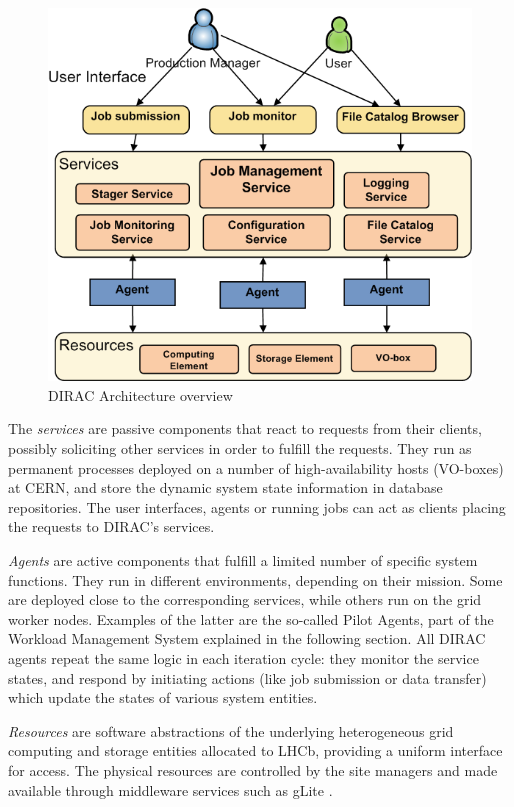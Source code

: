 \documentclass[10pt,conference]{IEEEtran}
\begin{document}
\begin{figure}[t]
\includegraphics[width=0.85\linewidth,keepaspectratio=true]{./DIRAC_Architecture.png}
\centering
\caption{DIRAC Architecture overview}
\vspace{-10 pt}
\label{fig:DIRAC-Arch}
\end{figure}
The \textit{services} are passive components that react to requests from their clients,
possibly soliciting other services in order to fulfill the requests. They run as
permanent processes deployed on a number of high-availability hosts (VO-boxes)
at CERN, and store the dynamic system state information in database
repositories. The user interfaces, agents or running jobs can act as clients
placing the requests to DIRAC's services.

\textit{Agents} are active components that fulfill a limited number of specific system
functions. They run in different environments, depending on their mission.
Some are deployed close to the corresponding services, while others run on the
grid worker nodes. Examples of the latter are the so-called Pilot Agents, part
of the Workload Management System explained in the following section. All DIRAC
agents repeat the same logic in each iteration cycle: they monitor the service states,
 and respond by initiating actions (like job
submission or data transfer) which update the states of various system
entities.

\textit{Resources} are software abstractions of the underlying heterogeneous grid
computing and storage entities allocated to LHCb, providing a uniform interface
for access. The physical resources are controlled by the site managers and made
available through middleware services such as gLite \cite{gLite}.
\end{document}
